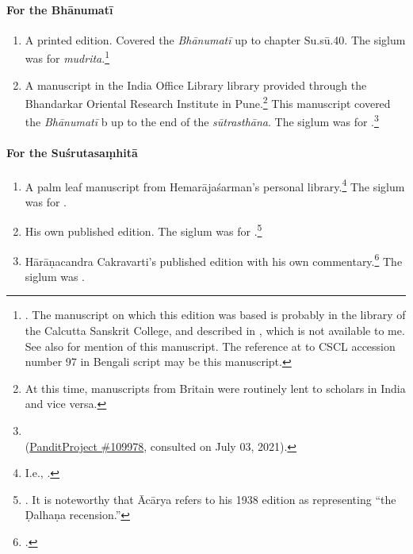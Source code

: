 \paragraph{For the Bhānumatī}

\begin{enumerate}
    \item A printed edition.  Covered the \emph{Bhānumatī} up to chapter Su.sū.40.
    The siglum was  for \emph{mudrita}.\footnote{\cite{sena-1886}.  
    The
    manuscript on which this edition was based is probably in the library of the
    Calcutta Sanskrit College, and described in \cite[v.\,X.1]{sast-1917}, which
    is not available to me.  See also \cite[IB, 495, n.\,57]{meul-hist} for
    mention of this manuscript.  The reference at \cite[217]{rao-sans} to CSCL
    accession number 97 in Bengali script may be this manuscript.}
    
    \item A manuscript in the India Office Library library provided through the
    Bhandarkar Oriental Research Institute in Pune.\footnote{At this time,
    manuscripts from Britain were routinely lent to scholars in India and vice
    versa.} This manuscript covered the \emph{Bhānumatī} b up to the end of the
    \emph{sūtrasthāna}.  The siglum was  for
    .\footnote{\cite{PP109978}\\ 
    (\href{panditproject.org/entity/109978/manuscript}{PanditProject \#109978},
    consulted on July 03, 2021).}
\end{enumerate}

\paragraph{For the Suśrutasaṃhitā}

\begin{enumerate}
    \item A palm leaf manuscript from Hemarājaśarman's personal
    library.\footnote{I.e., .}  The siglum was
     for .
    
    \item His own published edition. The siglum was  for 
    .\footnote{\cite{vulgate}.  It is noteworthy that Ācārya refers to
    his 1938 edition as representing “the Ḍalhaṇa recension.”}
    
    \item Hārāṇacandra Cakravarti's published edition with his own
    commentary.\footcite{bhat-1917} The siglum was .
\end{enumerate}
%
